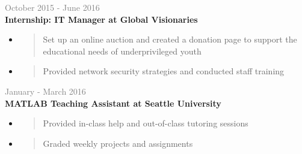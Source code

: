 \documentclass[letterpage]{article}
\begin{document}
\begin{minipage}[t]{0.63\linewidth}
\vspace{7px}
\textcolor{gray}{October 2015 - June 2016}\\
\textbf{\textsf{Internship: IT Manager at Global Visionaries}}\\
\begin{itemize}[leftmargin=*,labelindent=1mm,labelsep=0mm]
\renewcommand\labelitemi{\rule[1mm]{0.33mm}{0.33mm}}
\renewcommand\labelitemii{$\blacksquare$}
\item
  \begin{quote}
  \raggedright
  Set up an online auction and created a donation page to
  support the educational needs of underprivileged youth
  \end{quote}
\item
  \begin{quote}
  \raggedright
  Provided network security strategies and conducted staff
  training
  \end{quote}
\end{itemize}

\vspace{7px}
\textcolor{gray}{January - March 2016}\\
\textbf{\textsf{MATLAB Teaching Assistant at Seattle University}}
\begin{itemize}[leftmargin=*,labelindent=1mm,labelsep=0mm]
\renewcommand\labelitemi{\rule[1mm]{0.33mm}{0.33mm}}
\renewcommand\labelitemii{$\blacksquare$}
\item
  \begin{quote}
  \raggedright
  Provided in-class help and out-of-class tutoring sessions
  \end{quote}
\item
  \begin{quote}
  \raggedright
  Graded weekly projects and assignments
  \end{quote}
\end{itemize}

\end{minipage}
\end{document}
